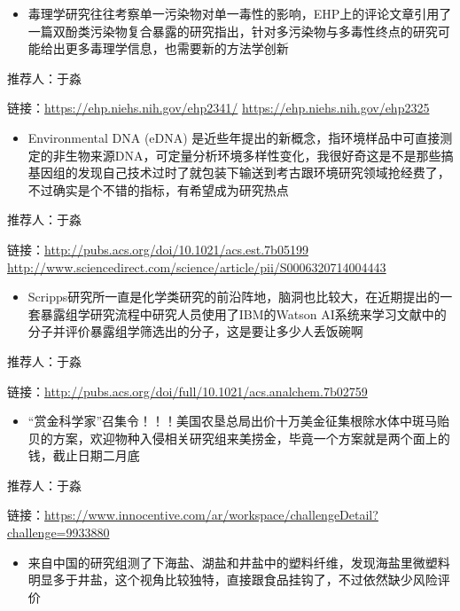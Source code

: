 \documentclass[]{book}
\providecommand{\tightlist}{%
  \setlength{\itemsep}{0pt}\setlength{\parskip}{0pt}}
\begin{document}
\begin{itemize}
\tightlist
\item
  毒理学研究往往考察单一污染物对单一毒性的影响，EHP上的评论文章引用了一篇双酚类污染物复合暴露的研究指出，针对多污染物与多毒性终点的研究可能给出更多毒理学信息，也需要新的方法学创新
\end{itemize}

推荐人：于淼

链接：\url{https://ehp.niehs.nih.gov/ehp2341/}
\url{https://ehp.niehs.nih.gov/ehp2325}

\begin{itemize}
\tightlist
\item
  Environmental DNA (eDNA)
  是近些年提出的新概念，指环境样品中可直接测定的非生物来源DNA，可定量分析环境多样性变化，我很好奇这是不是那些搞基因组的发现自己技术过时了就包装下输送到考古跟环境研究领域抢经费了，不过确实是个不错的指标，有希望成为研究热点
\end{itemize}

推荐人：于淼

链接：\url{http://pubs.acs.org/doi/10.1021/acs.est.7b05199}
\url{http://www.sciencedirect.com/science/article/pii/S0006320714004443}

\begin{itemize}
\tightlist
\item
  Scripps研究所一直是化学类研究的前沿阵地，脑洞也比较大，在近期提出的一套暴露组学研究流程中研究人员使用了IBM的Watson
  AI系统来学习文献中的分子并评价暴露组学筛选出的分子，这是要让多少人丢饭碗啊
\end{itemize}

推荐人：于淼

链接：\url{http://pubs.acs.org/doi/full/10.1021/acs.analchem.7b02759}

\begin{itemize}
\tightlist
\item
  ``赏金科学家''召集令！！！美国农垦总局出价十万美金征集根除水体中斑马贻贝的方案，欢迎物种入侵相关研究组来美捞金，毕竟一个方案就是两个面上的钱，截止日期二月底
\end{itemize}

推荐人：于淼

链接：\url{https://www.innocentive.com/ar/workspace/challengeDetail?challenge=9933880}

\begin{itemize}
\tightlist
\item
  来自中国的研究组测了下海盐、湖盐和井盐中的塑料纤维，发现海盐里微塑料明显多于井盐，这个视角比较独特，直接跟食品挂钩了，不过依然缺少风险评价
\end{itemize}
\end{document}
